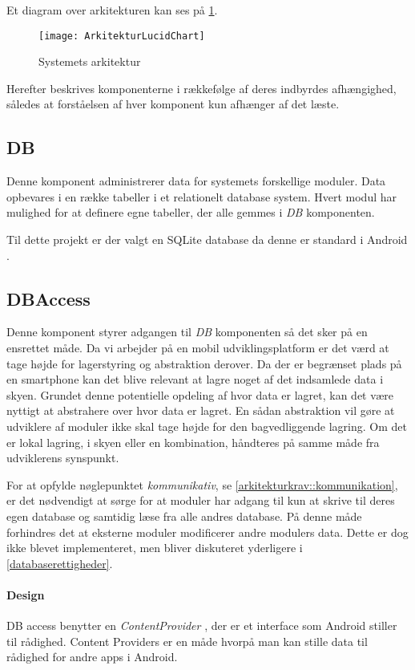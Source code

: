 Et diagram over arkitekturen kan ses på \cref{arkitektur_udkast_1}.
\begin{figure}[h]
	\centering						%
	\texttt{[image: ArkitekturLucidChart]}
	\caption{Systemets arkitektur}
  \label{arkitektur_udkast_1}
\end{figure}

Herefter beskrives komponenterne i rækkefølge af deres indbyrdes afhængighed, således at forståelsen af hver komponent kun afhænger af det læste.

\subsection{DB}
Denne komponent administrerer data for systemets forskellige moduler.
Data opbevares i en række tabeller i et relationelt database system.
Hvert modul har mulighed for at definere egne tabeller, der alle gemmes i \textit{DB} komponenten.

Til dette projekt er der valgt en SQLite database da denne er standard i Android \citep{android_database}.


\subsection{DBAccess}\label{subsec:DBACCESS}
Denne komponent styrer adgangen til \textit{DB} komponenten så det sker på en ensrettet måde.
Da vi arbejder på en mobil udviklingsplatform er det værd at tage højde for lagerstyring og abstraktion derover.
Da der er begrænset plads på en smartphone kan det blive relevant at lagre noget af det indsamlede data i skyen.
Grundet denne potentielle opdeling af hvor data er lagret, kan det være nyttigt at abstrahere over hvor data er lagret.
En sådan abstraktion vil gøre at udviklere af moduler ikke skal tage højde for den bagvedliggende lagring.
Om det er lokal lagring, i skyen eller en kombination, håndteres på samme måde fra udviklerens synspunkt.

For at opfylde nøglepunktet \textit{kommunikativ}, se \cref{arkitekturkrav::kommunikation}, er det nødvendigt at sørge for at moduler har adgang til kun at skrive til deres egen database og samtidig læse fra alle andres database.
På denne måde forhindres det at eksterne moduler modificerer andre modulers data.
Dette er dog ikke blevet implementeret, men bliver diskuteret yderligere i \cref{databaserettigheder}.

\paragraph{Design} 
DB access benytter en \textit{ContentProvider} \citep{contentprovider}, der er et interface som Android stiller til rådighed.
Content Providers er en måde hvorpå man kan stille data til rådighed for andre apps i Android.

